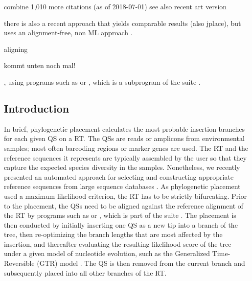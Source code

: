 combine 1,010 more citations (as of 2018-07-01)
see also recent art version

there is also a recent approach that yields comparable results (also jplace), but uses an alignment-free, non ML approach \cite{Linard2018}.


aligning

kommt unten noch mal!

, using programs such as  \citep{Berger2011a,Berger2012} or
, which is a subprogram of the  suite \citep{Eddy1998,Eddy2009}.


\subsection{Introduction}
\label{ch:Foundations:sec:PhylogeneticPlacement:sub:Introduction}


In brief, phylogenetic placement calculates the most probable insertion branches for each given \acf{QS} on a \acf{RT}.
The \acp{QS} are reads or amplicons from environmental samples; most often barcoding regions or marker genes are used.
The \ac{RT} and the reference sequences it represents are typically assembled by the user
so that they capture the expected species diversity in the samples.
Nonetheless, we recently presented an automated approach
for selecting and constructing appropriate reference sequences from large sequence databases \cite{Czech2018}.
As phylogenetic placement used a maximum likelihood criterion, the \ac{RT} has to be strictly bifurcating.
Prior to the placement, the \acp{QS} need to be aligned against the reference alignment of the \ac{RT} by programs such as
 \cite{Berger2011a,Berger2012} or
, which is part of the  suite \cite{Eddy1998,Eddy2009}.
The placement is then conducted by initially inserting one \ac{QS} as a new tip into a branch of the tree,
then re-optimizing the branch lengths that are most affected by the insertion,
and thereafter evaluating the resulting likelihood score of the tree under a given model of nucleotide evolution,
such as the Generalized Time-Reversible (GTR) model \cite{Tavare1986}.
The \ac{QS} is then removed from the current branch and subsequently placed into all other branches of the \ac{RT}.

